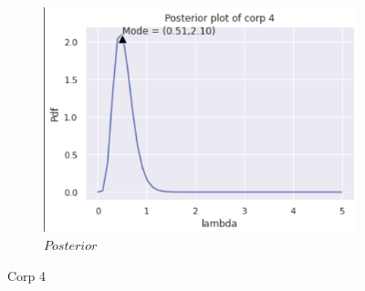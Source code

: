 \documentclass[english,a4paper,12pt]{article}
\begin{document}
\begin{enumerate}
\begin{itemize}
{\begin{figure} [h!]
\begin{subfigure}[b]{0.3\textwidth}
         \includegraphics[width=\textwidth]{pictures/Q3/Posterior_C4.png}
         \caption{$Posterior$}
         \label{Posterior}
     \end{subfigure}
     \caption{Corp 4}
        \label{Corp 4 }
\end{figure}}



\end{itemize}
\end{enumerate}
\end{document}
